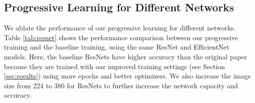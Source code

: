 \documentclass{article}
\begin{document}
\begin{table}[h]
    \vskip -0.15in
    \centering
    \caption{
    Scaling down model size -- We measure the inference throughput (images/sec) on V100 FP16 GPU with batch size 128.}
    \vskip -0.1in
\label{tab:v1v2compare}
\end{table} 
\subsection{Progressive Learning for Different Networks}
We ablate the performance of our progressive learning for different networks. Table \ref{tab:resnet} shows the performance comparison between our progressive training and the baseline training,  using the same ResNet and EfficientNet models.  Here, the baseline ResNets have higher accuracy than the original paper~\cite{resnet16} because they are trained with our improved training settings (see Section \ref{sec:results}) using more epochs and better optimizers. We also increase the image size from 224 to 380 for ResNets to further increase the network capacity and accuracy. 
\end{document}
